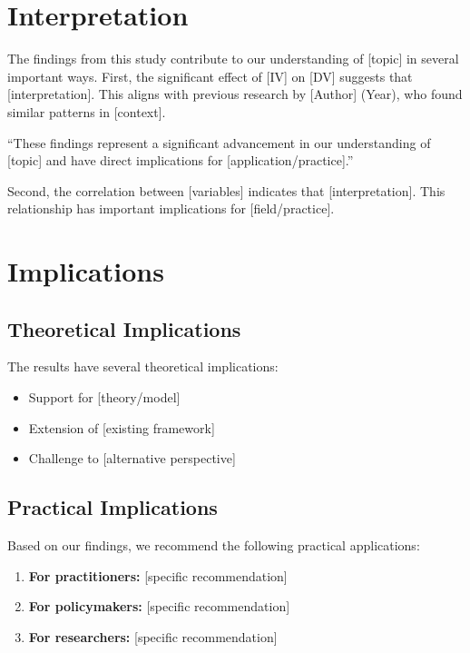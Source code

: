 \documentclass[11pt,letterpaper]{report}
\begin{document}
\section{Interpretation}

The findings from this study contribute to our understanding of [topic] in several important ways. First, the significant effect of [IV] on [DV] suggests that [interpretation]. This aligns with previous research by [Author] (Year), who found similar patterns in [context].

\begin{pullquote}
``These findings represent a significant advancement in our understanding of [topic] and have direct implications for [application/practice].''
\end{pullquote}

Second, the correlation between [variables] indicates that [interpretation]. This relationship has important implications for [field/practice].

\section{Implications}

\subsection{Theoretical Implications}

The results have several theoretical implications:

\begin{itemize}
    \item Support for [theory/model]
    \item Extension of [existing framework]
    \item Challenge to [alternative perspective]
\end{itemize}

\subsection{Practical Implications}

\begin{recommendations}
Based on our findings, we recommend the following practical applications:
\begin{enumerate}
    \item \textbf{For practitioners:} [specific recommendation]
    \item \textbf{For policymakers:} [specific recommendation]
    \item \textbf{For researchers:} [specific recommendation]
\end{enumerate}
\end{recommendations}
\end{document}
